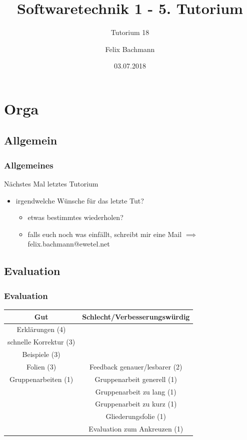\documentclass[18pt]{beamer}
\title[SWT1]{Softwaretechnik 1 - 5. Tutorium}
\subtitle{Tutorium 18}
\author{Felix Bachmann}
\date{03.07.2018}
\institute{KIT - Institut für Programmstrukturen und Datenorganisation (IPD)}
\begin{document}
	
	
\begin{frame}
\titlepage
\end{frame}

\begin{frame}
\tableofcontents
\end{frame}


\section{Orga}

	\subsection{Allgemein}
	\begin{frame}
		\frametitle{Allgemeines}
		\begin{alertblock}{Nächstes Mal letztes Tutorium} 
		\begin{itemize}
			\item irgendwelche Wünsche für das letzte Tut?
			\begin{itemize}
				\item etwas bestimmtes wiederholen?
				\item falls euch noch was einfällt, schreibt mir eine Mail
				\linebreak $\implies$ felix.bachmann@ewetel.net
			\end{itemize}
		\end{itemize}
		\end{alertblock}
	\end{frame}

	\subsection{Evaluation}
	\begin{frame}
		\frametitle{Evaluation}
		\centering
		\begin{tabular}{|c|c|}
			\hline 
			Gut & Schlecht/Verbesserungswürdig \\ 
			\hline
			Erklärungen (4) & \\
			schnelle Korrektur (3) & \\ 
			Beispiele (3) & \\
			Folien (3) & Feedback genauer/lesbarer (2) \\
			Gruppenarbeiten (1)&  Gruppenarbeit generell (1)\\ 
			&  Gruppenarbeit zu lang (1)\\ 
			& Gruppenarbeit zu kurz (1)\\
			& Gliederungsfolie (1) \\
			& Evaluation zum Ankreuzen (1)\\
			\hline 
		\end{tabular} 
	\end{frame}
\end{document}
